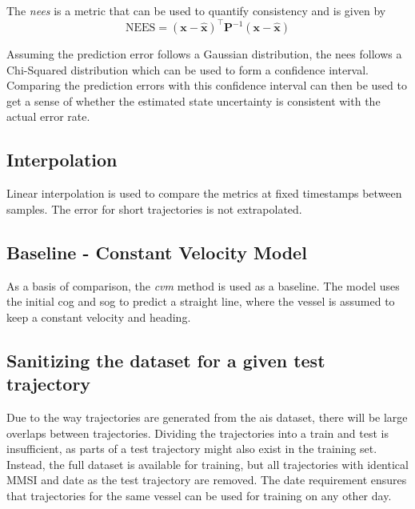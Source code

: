 The \textit{\acrfull{nees}} is a metric that can be used to quantify consistency and is given by
\begin{equation}
    \text{NEES} = (\boldsymbol{x} - \hat{\boldsymbol{x}})^\intercal \boldsymbol{P}^{-1} (\boldsymbol{x} - \hat{\boldsymbol{x}})
\end{equation}

Assuming the prediction error follows a Gaussian distribution, the \acrshort{nees} follows a Chi-Squared distribution which can be used to form a confidence interval. Comparing the prediction errors with this confidence interval can then be used to get a sense of whether the estimated state uncertainty is consistent with the actual error rate.

\subsection{Interpolation}
Linear interpolation is used to compare the metrics at fixed timestamps between samples. The error for short trajectories is not extrapolated.

\subsection{Baseline - Constant Velocity Model}
As a basis of comparison, the \textit{\acrfull{cvm}} method is used as a baseline. The model uses the initial \acrshort{cog} and \acrshort{sog} to predict a straight line, where the vessel is assumed to keep a constant velocity and heading.

\subsection{Sanitizing the dataset for a given test trajectory}
Due to the way trajectories are generated from the \acrshort{ais} dataset, there will be large overlaps between trajectories. Dividing the trajectories into a train and test is insufficient, as parts of a test trajectory might also exist in the training set. Instead, the full dataset is available for training, but all trajectories with identical MMSI and date as the test trajectory are removed. The date requirement ensures that trajectories for the same vessel can be used for training on any other day.

